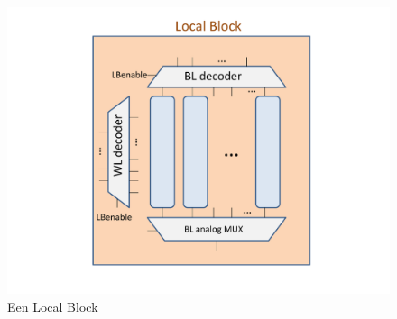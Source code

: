 \begin{figure}
  \centering
  \includegraphics[scale=0.3]{../fig/hfdstk-architecture-localblock.pdf}
  \caption{Een Local Block}
  \label{fig:LB}
\end{figure}

